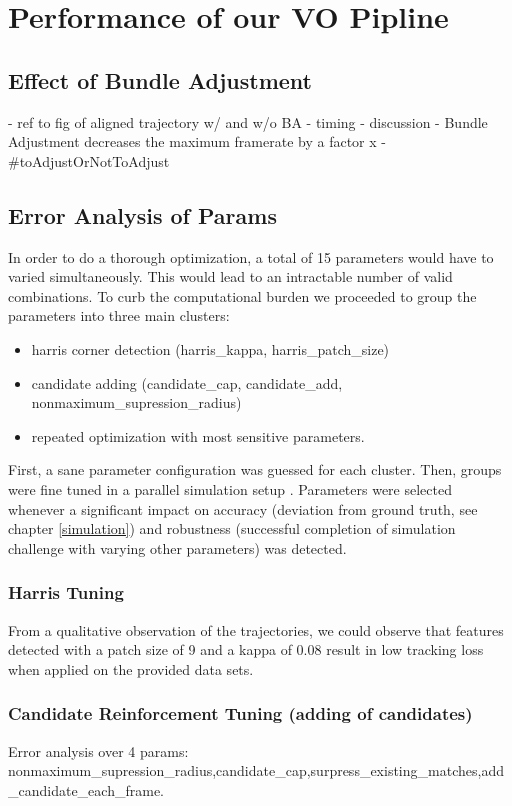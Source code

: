 \chapter{Performance of our VO Pipline}
\label{performance}

\section{Effect of Bundle Adjustment}
- ref to fig of aligned trajectory w/ and w/o BA
- timing 
- discussion
- Bundle Adjustment decreases the maximum framerate by a factor x
- #toAdjustOrNotToAdjust

\section{Error Analysis of Params}

In order to do a thorough optimization, a total of 15 parameters would have to varied simultaneously. 
This would lead to an intractable number of valid combinations. To curb the computational burden we proceeded to group the parameters into three main clusters:

\begin{itemize}
    \item harris corner detection (harris\_kappa, harris\_patch\_size)
    \item candidate adding (candidate\_cap, candidate\_add, nonmaximum\_supression\_radius)
    \item repeated optimization with most sensitive parameters.
\end{itemize}

First, a sane parameter configuration was guessed for each cluster. Then, groups were fine tuned in a parallel simulation setup \coderef{simTaskScheduler.m]}. Parameters were selected whenever a significant impact on accuracy (deviation from ground truth, see chapter \ref{simulation}) and robustness (successful completion of simulation challenge with varying other parameters) was detected.

\subsection{Harris Tuning}
From a qualitative observation of the trajectories, we could observe that features detected with a patch size of 9 and a kappa of 0.08 result in low tracking loss when applied on the provided data sets.

\subsection{Candidate Reinforcement Tuning (adding of candidates)} 
Error analysis over 4 params: nonmaximum\_supression\_radius,candidate\_cap,surpress\_existing\_matches,add\_candidate_each\_frame.

